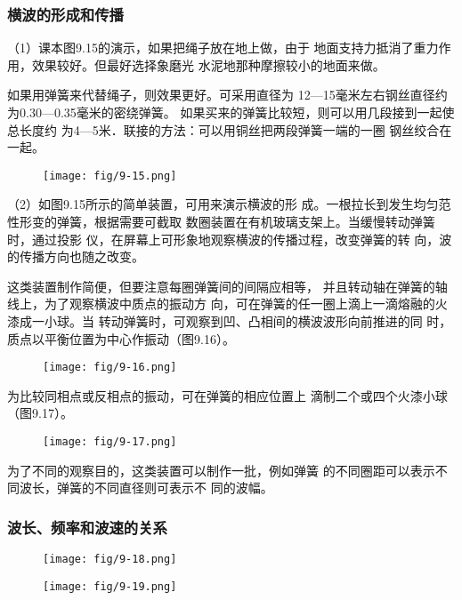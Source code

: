 \subsubsection{横波的形成和传播}
（1）课本图9.15的演示，如果把绳子放在地上做，由于
地面支持力抵消了重力作用，效果较好。但最好选择象磨光
水泥地那种摩擦较小的地面来做。

如果用弹簧来代替绳子，则效果更好。可采用直径为
12—15毫米左右钢丝直径约为0.30—0.35毫米的密绕弹簧。
如果买来的弹簧比较短，则可以用几段接到一起使总长度约
为4—5米．联接的方法：可以用铜丝把两段弹簧一端的一圈
钢丝绞合在一起。
\begin{figure}[htp]
    \centering
    \texttt{[image: fig/9-15.png]}
    \caption{}
\end{figure}

（2）如图9.15所示的简单装置，可用来演示横波的形
成。一根拉长到发生均匀范性形变的弹簧，根据需要可截取
数圈装置在有机玻璃支架上。当缓慢转动弹簧时，通过投影
仪，在屏幕上可形象地观察横波的传播过程，改变弹簧的转
向，波的传播方向也随之改变。

这类装置制作简便，但要注意每圈弹簧间的间隔应相等，
并且转动轴在弹簧的轴线上，为了观察横波中质点的振动方
向，可在弹簧的任一圈上滴上一滴熔融的火漆成一小球。当
转动弹簧时，可观察到凹、凸相间的横波波形向前推进的同
时，质点以平衡位置为中心作振动（图9.16）。

\begin{figure}[htp]
    \centering
    \texttt{[image: fig/9-16.png]}
    \caption{}
\end{figure}

为比较同相点或反相点的振动，可在弹簧的相应位置上
滴制二个或四个火漆小球（图9.17）。

\begin{figure}[htp]
    \centering
    \texttt{[image: fig/9-17.png]}
    \caption{}
\end{figure}

为了不同的观察目的，这类装置可以制作一批，例如弹簧
的不同圈距可以表示不同波长，弹簧的不同直径则可表示不
同的波幅。

\subsubsection{波长、频率和波速的关系}

\begin{figure}[htp]\centering
    \begin{minipage}[t]{0.48\textwidth}
    \centering
\texttt{[image: fig/9-18.png]}
    \caption{}
    \end{minipage}
    \begin{minipage}[t]{0.48\textwidth}
    \centering
\texttt{[image: fig/9-19.png]}
    \caption{}
    \end{minipage}
    \end{figure}

